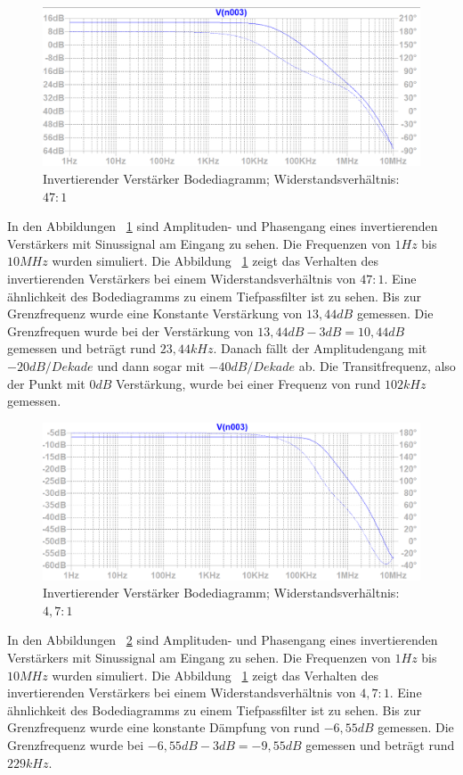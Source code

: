 \documentclass[12pt,a4paper,titlepage]{article}
\begin{document}
\begin{figure}[H]
  \centering
  \includegraphics[width=150mm]{invertierend_bode1}
  \caption{Invertierender Verst\"arker Bodediagramm; Widerstandsverh\"altnis: $47:1$}
  \label{figure15}
\end{figure}
In den Abbildungen ~\ref{figure15} sind Amplituden- und Phasengang eines invertierenden Verst\"arkers mit Sinussignal am Eingang zu sehen. Die Frequenzen von $1Hz$ bis $10MHz$ wurden simuliert. Die Abbildung ~\ref{figure15} zeigt das Verhalten des invertierenden Verst\"arkers bei einem Widerstandsverh\"altnis von $47:1$. Eine \"ahnlichkeit des Bodediagramms zu einem Tiefpassfilter ist zu sehen. Bis zur Grenzfrequenz wurde eine Konstante Verst\"arkung von $13,44dB$ gemessen. Die Grenzfrequen wurde bei der Verst\"arkung von $13,44dB - 3dB = 10,44dB$ gemessen und betr\"agt rund $23,44kHz$. Danach f\"allt der Amplitudengang mit $-20dB/Dekade$ und dann sogar mit $-40dB/Dekade$ ab. Die Transitfrequenz, also der Punkt mit $0dB$ Verst\"arkung, wurde bei einer Frequenz von rund $102kHz$ gemessen.

\begin{figure}[H]
  \centering
  \includegraphics[width=150mm]{invertierend_bode2}
  \caption{Invertierender Verst\"arker Bodediagramm; Widerstandsverh\"altnis: $4,7:1$}
  \label{figure16}
\end{figure}
In den Abbildungen ~\ref{figure16} sind Amplituden- und Phasengang eines invertierenden Verst\"arkers mit Sinussignal am Eingang zu sehen. Die Frequenzen von $1Hz$ bis $10MHz$ wurden simuliert. Die Abbildung ~\ref{figure15} zeigt das Verhalten des invertierenden Verst\"arkers bei einem Widerstandsverh\"altnis von $4,7:1$. Eine \"ahnlichkeit des Bodediagramms zu einem Tiefpassfilter ist zu sehen. Bis zur Grenzfrequenz wurde eine konstante D\"ampfung von rund $-6,55dB$ gemessen. Die Grenzfrequenz wurde bei $-6,55dB - 3dB = -9,55dB$ gemessen und betr\"agt rund $229kHz$.
\end{document}
